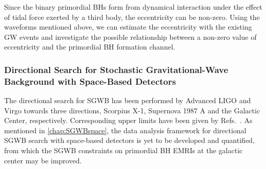 Since the binary primordial \acp{BH} form from dynamical interaction under the effect of tidal force exerted by a third body, the eccentricity can be non-zero.
Using the waveforms mentioned above, we can estimate the eccentricity with the existing \ac{GW} events and investigate the possible relationship between a non-zero value of eccentricity and the primordial \ac{BH} formation channel. 

\subsubsection{Directional Search for Stochastic Gravitational-Wave Background with Space-Based Detectors}

The directional search for \ac{SGWB} has been performed by Advanced LIGO and Virgo towards three directions, Scorpius X-1, Supernova 1987 A and the Galactic Center, respectively.
Corresponding upper limits have been given by Refs.~\cite{directional1,directional2,directional3}. 
As mentioned in \cref{chap:SGWBspace}, the data analysis framework for directional \ac{SGWB} search with space-based detectors is yet to be developed and quantified, from which the \ac{SGWB} constraints on primordial \ac{BH} \acp{EMRI} at the galactic center may be improved.


